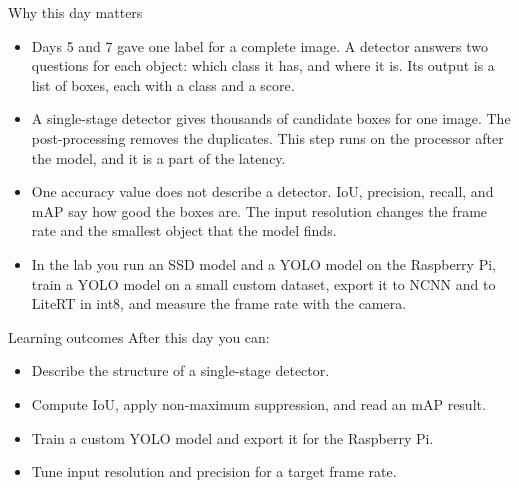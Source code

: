\begin{frame}{Why this day matters}
  \begin{itemize}
    \item Days 5 and 7 gave one label for a complete image. A detector answers
          two questions for each object: which class it has, and where it is.
          Its output is a list of boxes, each with a class and a score.
    \item A single-stage detector gives thousands of candidate boxes for one
          image. The post-processing removes the duplicates. This step runs on
          the processor after the model, and it is a part of the latency.
    \item One accuracy value does not describe a detector. IoU, precision,
          recall, and mAP say how good the boxes are. The input resolution
          changes the frame rate and the smallest object that the model finds.
    \item In the lab you run an SSD model and a YOLO model on the Raspberry
          Pi, train a YOLO model on a small custom dataset, export it to NCNN
          and to LiteRT in int8, and measure the frame rate with the camera.
  \end{itemize}
\end{frame}

\begin{frame}{Learning outcomes}
  After this day you can:
  \begin{itemize}
    \item Describe the structure of a single-stage detector.
    \item Compute IoU, apply non-maximum suppression, and read an mAP result.
    \item Train a custom YOLO model and export it for the Raspberry Pi.
    \item Tune input resolution and precision for a target frame rate.
  \end{itemize}
\end{frame}
